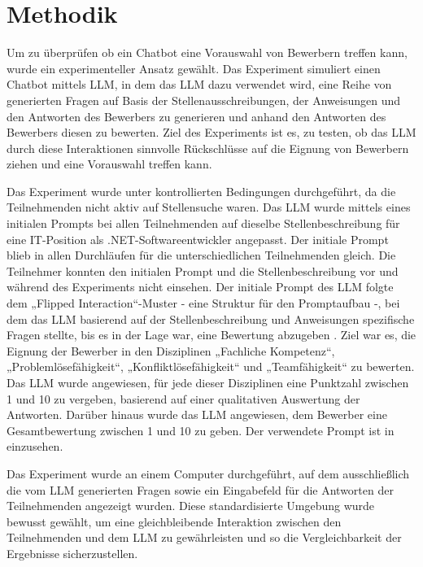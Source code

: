 
\chapter{Methodik}

Um zu überprüfen ob ein Chatbot eine Vorauswahl von Bewerbern treffen kann, wurde ein experimenteller Ansatz gewählt. 
Das Experiment simuliert einen Chatbot mittels \acs{LLM}, in dem das \acs{LLM} dazu verwendet wird, 
eine Reihe von generierten Fragen auf Basis der Stellenausschreibungen,
der Anweisungen und den Antworten des Bewerbers zu generieren und anhand den Antworten des Bewerbers 
diesen zu bewerten. Ziel des Experiments ist es, zu testen, ob das \acs{LLM} durch diese Interaktionen 
sinnvolle Rückschlüsse auf die Eignung von Bewerbern ziehen und eine Vorauswahl treffen kann.


Das Experiment wurde unter kontrollierten Bedingungen durchgeführt, da die Teilnehmenden nicht aktiv auf Stellensuche waren. 
Das \acs{LLM} wurde mittels eines initialen Prompts bei allen Teilnehmenden auf dieselbe Stellenbeschreibung 
für eine IT-Position als .NET-Softwareentwickler angepasst. Der initiale Prompt blieb in allen 
Durchläufen für die unterschiedlichen Teilnehmenden gleich. Die Teilnehmer konnten den initialen Prompt und die Stellenbeschreibung vor und während 
des Experiments nicht einsehen. 
Der initiale Prompt des \acs{LLM} folgte dem „Flipped Interaction“-Muster - eine Struktur für den Promptaufbau -, bei dem das \acs{LLM} basierend 
auf der Stellenbeschreibung und Anweisungen spezifische Fragen stellte, bis es in der Lage war, 
eine Bewertung abzugeben \cite{white:2023}. Ziel war es, die Eignung der Bewerber in den Disziplinen 
„Fachliche Kompetenz“, „Problemlösefähigkeit“, „Konfliktlösefähigkeit“ und „Teamfähigkeit“ zu 
bewerten. Das \acs{LLM} wurde angewiesen, für jede dieser Disziplinen eine Punktzahl zwischen 1 und 10 
zu vergeben, basierend auf einer qualitativen Auswertung der Antworten. Darüber hinaus wurde das \acs{LLM} 
angewiesen, dem Bewerber eine Gesamtbewertung zwischen 1 und 10 zu geben. Der verwendete Prompt 
ist in  einzusehen. 


Das Experiment wurde an einem Computer durchgeführt, auf dem ausschließlich die vom \acs{LLM} 
generierten Fragen sowie ein Eingabefeld für die Antworten der Teilnehmenden angezeigt wurden. 
Diese standardisierte Umgebung wurde bewusst gewählt, um eine gleichbleibende Interaktion zwischen 
den Teilnehmenden und dem \acs{LLM} zu gewährleisten und so die Vergleichbarkeit der Ergebnisse 
sicherzustellen. 


